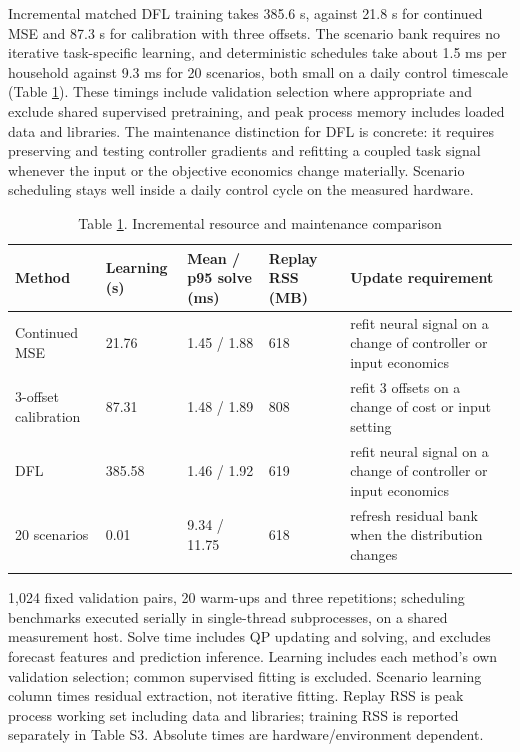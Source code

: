 \documentclass[pdflatex,Numbered,sn-basic]{sn-jnl}
\begin{document}
Incremental matched DFL training takes 385.6 s, against 21.8 s for continued MSE and 87.3 s for calibration with three offsets. The scenario bank requires no iterative task-specific learning, and deterministic schedules take about 1.5 ms per household against 9.3 ms for 20 scenarios, both small on a daily control timescale (Table \ref{tab3}). These timings include validation selection where appropriate and exclude shared supervised pretraining, and peak process memory includes loaded data and libraries. The maintenance distinction for DFL is concrete: it requires preserving and testing controller gradients and refitting a coupled task signal whenever the input or the objective economics change materially. Scenario scheduling stays well inside a daily control cycle on the measured hardware.

\begin{table}[htbp]
\centering
\caption{Table \ref{tab3}. Incremental resource and maintenance comparison}
\label{tab3}
\small
\setlength{\tabcolsep}{3pt}
\begin{tabular}{@{}p{64pt}p{46pt}p{56pt}p{50pt}p{150pt}@{}}
\toprule
\textbf{Method} & \textbf{Learning (s)} & \textbf{Mean / p95 solve (ms)} & \textbf{Replay RSS (MB)} & \textbf{Update requirement} \\
\midrule
Continued MSE & 21.76 & 1.45 / 1.88 & 618 & refit neural signal on a change of controller or input economics \\
3-offset calibration & 87.31 & 1.48 / 1.89 & 808 & refit 3 offsets on a change of cost or input setting \\
DFL & 385.58 & 1.46 / 1.92 & 619 & refit neural signal on a change of controller or input economics \\
20 scenarios & 0.01 & 9.34 / 11.75 & 618 & refresh residual bank when the distribution changes \\
\botrule
\end{tabular}
\par\vspace{2pt}
\footnotesize 1,024 fixed validation pairs, 20 warm-ups and three repetitions; scheduling benchmarks executed serially in single-thread subprocesses, on a shared measurement host. Solve time includes QP updating and solving, and excludes forecast features and prediction inference. Learning includes each method's own validation selection; common supervised fitting is excluded. Scenario learning column times residual extraction, not iterative fitting. Replay RSS is peak process working set including data and libraries; training RSS is reported separately in Table S3. Absolute times are hardware/environment dependent.
\end{table}
\end{document}
